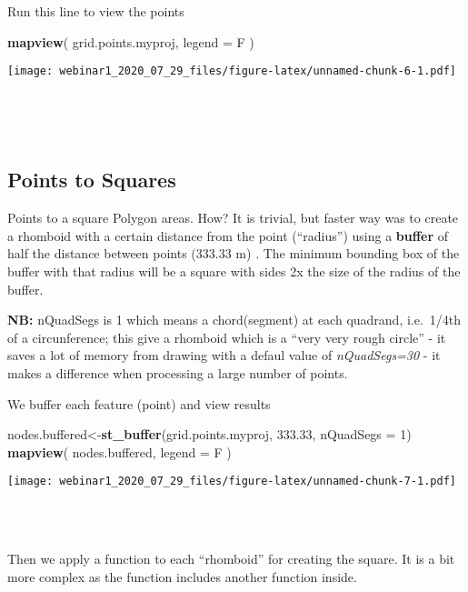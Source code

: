 \documentclass[]{article}
\newenvironment{Shaded}{\begin{snugshade}}{\end{snugshade}}
\newcommand{\DataTypeTok}[1]{\textcolor[rgb]{0.13,0.29,0.53}{#1}}
\newcommand{\DecValTok}[1]{\textcolor[rgb]{0.00,0.00,0.81}{#1}}
\newcommand{\FloatTok}[1]{\textcolor[rgb]{0.00,0.00,0.81}{#1}}
\newcommand{\KeywordTok}[1]{\textcolor[rgb]{0.13,0.29,0.53}{\textbf{#1}}}
\newcommand{\NormalTok}[1]{#1}
\begin{document}
Run this line to view the points

\begin{Shaded}
\begin{Highlighting}[]
  \KeywordTok{mapview}\NormalTok{( grid.points.myproj, }\DataTypeTok{legend =}\NormalTok{ F  )}
\end{Highlighting}
\end{Shaded}

\texttt{[image: webinar1\_2020\_07\_29\_files/figure-latex/unnamed-chunk-6-1.pdf]}

~

~

\hypertarget{points-to-squares}{%
\subsection{Points to Squares}\label{points-to-squares}}

Points to a square Polygon areas. How? It is trivial, but faster way was
to create a rhomboid with a certain distance from the point (``radius'')
using a \textbf{buffer} of half the distance between points (333.33 m) .
The minimum bounding box of the buffer with that radius will be a square
with sides 2x the size of the radius of the buffer.

\textbf{NB:} nQuadSegs is 1 which means a chord(segment) at each
quadrand, i.e.~1/4th of a circunference; this give a rhomboid which is a
``very very rough circle'' - it saves a lot of memory from drawing with
a defaul value of \emph{nQuadSegs=30} - it makes a difference when
processing a large number of points.

We buffer each feature (point) and view results

\begin{Shaded}
\begin{Highlighting}[]
\NormalTok{nodes.buffered<-}\KeywordTok{st_buffer}\NormalTok{(grid.points.myproj, }\FloatTok{333.33}\NormalTok{,  }\DataTypeTok{nQuadSegs =} \DecValTok{1}\NormalTok{)}
\KeywordTok{mapview}\NormalTok{( nodes.buffered, }\DataTypeTok{legend =}\NormalTok{ F  )}
\end{Highlighting}
\end{Shaded}

\texttt{[image: webinar1\_2020\_07\_29\_files/figure-latex/unnamed-chunk-7-1.pdf]}
~

~

Then we apply a function to each ``rhomboid'' for creating the square.
It is a bit more complex as the function includes another function
inside.
\end{document}
